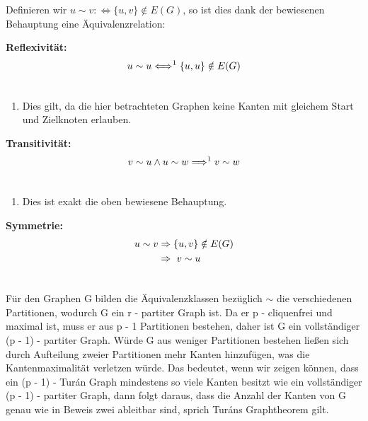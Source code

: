 \documentclass[12pt, a4paper]{article}
\begin{document}
Definieren wir $u \sim v :\Longleftrightarrow \{ u,v \} \notin E(G)$, so ist dies dank der bewiesenen Behauptung eine Äquivalenzrelation:

\textbf{Reflexivität:}
\begin{gather}
\begin{split}u \sim u \Longleftrightarrow^1 \{ u,u \} \notin E(G)\end{split}\notag\\\begin{split}\end{split}\notag
\end{gather}\begin{enumerate}
\item {}
Dies gilt, da die hier betrachteten Graphen keine Kanten mit gleichem Start und Zielknoten erlauben.

\end{enumerate}

\textbf{Transitivität:}
\begin{gather}
\begin{split} v \sim u \wedge u \sim w \Longrightarrow^1 v \sim w\end{split}\notag\\\begin{split}\end{split}\notag
\end{gather}\begin{enumerate}
\item {}
Dies ist exakt die oben bewiesene Behauptung.

\end{enumerate}

\textbf{Symmetrie:}
\begin{gather}
\begin{split}u \sim v &\Rightarrow \{ u,v \} \notin E(G) \\
&\Rightarrow\ v \sim u\end{split}\notag\\\begin{split}\end{split}\notag
\end{gather}

Für den Graphen G bilden die Äquivalenzklassen bezüglich $\sim$ die verschiedenen Partitionen, wodurch G ein r - partiter Graph ist. Da er p - cliquenfrei und maximal ist, muss er aus p - 1 Partitionen bestehen, daher ist G ein vollständiger (p - 1) - partiter Graph. Würde G aus weniger Partitionen bestehen ließen sich durch Aufteilung zweier Partitionen mehr Kanten hinzufügen, was die Kantenmaximalität verletzen würde. Das bedeutet, wenn wir zeigen können, dass ein (p - 1) - Turán Graph mindestens so viele Kanten besitzt wie ein vollständiger (p - 1) - partiter Graph, dann folgt daraus, dass die Anzahl der Kanten von G genau wie in Beweis zwei ableitbar sind, sprich Turáns Graphtheorem gilt.
\newpage
\end{document}
